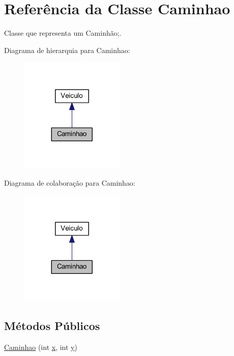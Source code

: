 \hypertarget{class_caminhao}{}\section{Referência da Classe Caminhao}
\label{class_caminhao}


Classe que representa um Caminhão;.  




Diagrama de hierarquia para Caminhao\+:
\nopagebreak
\begin{figure}[H]
\begin{center}
\leavevmode
\includegraphics[width=140pt]{class_caminhao__inherit__graph}
\end{center}
\end{figure}


Diagrama de colaboração para Caminhao\+:
\nopagebreak
\begin{figure}[H]
\begin{center}
\leavevmode
\includegraphics[width=140pt]{class_caminhao__coll__graph}
\end{center}
\end{figure}
\subsection*{Métodos Públicos}
\begin{DoxyCompactItemize}
\item 
\mbox{\hyperlink{class_caminhao_a7d012968951dc4bd2857c728dd3d0c79}{Caminhao}} (int \mbox{\hyperlink{class_veiculo_a069917a284297fe5b385258b2afd9ad6}{x}}, int \mbox{\hyperlink{class_veiculo_af25046404db7c2786c0d9e468bb1fb64}{y}})
\end{DoxyCompactItemize}
